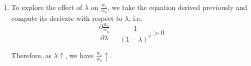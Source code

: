 \documentclass[12pt]{article}
\newcommand{\1}{{\bf 1}} %
\begin{document}
\begin{enumerate}[(1)]
	\item
	
	To explore the effect of $\lambda$ on $\frac{w_s}{w_u}$, we take the equation derived previously and compute its derivate with respect to $\lambda$, i.e.
	\[
	\frac{\partial \frac{w_s}{w_u}}{\partial \lambda} = \frac{1}{(1-\lambda)^2}>0
	\]
	
	Therefore, as $\lambda \uparrow$, we have $\frac{w_s}{w_u} \uparrow$. 
	
\end{enumerate}
\end{document}
